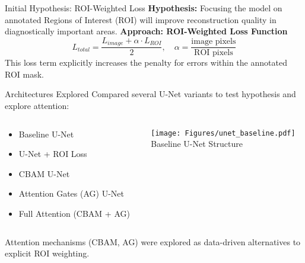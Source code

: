 \documentclass{beamer}
\begin{document}
\begin{frame}{Initial Hypothesis: ROI-Weighted Loss}
  \textbf{Hypothesis:} Focusing the model on annotated Regions of Interest (ROI) will improve reconstruction quality in diagnostically important areas.
  \vfill
  \textbf{Approach: ROI-Weighted Loss Function}
  \[
    L_{total} = \frac{L_{image} + \alpha \cdot L_{ROI}}{2}, \quad
    \alpha = \frac{\text{image pixels}}{\text{ROI pixels}}
  \]
  This loss term explicitly increases the penalty for errors within the annotated ROI mask.
\end{frame}

\begin{frame}{Architectures Explored}
  Compared several U-Net variants to test hypothesis and explore attention:
  \begin{columns}[T] %
    \begin{column}{0.5\textwidth}
      \begin{itemize}
          \item Baseline U-Net
          \item U-Net + ROI Loss
          \item CBAM U-Net
          \item Attention Gates (AG) U-Net
          \item Full Attention (CBAM + AG)
      \end{itemize}
    \end{column}
    \begin{column}{0.5\textwidth}
        \centering
        \texttt{[image: Figures/unet\_baseline.pdf]} \\
        \tiny Baseline U-Net Structure
    \end{column}
  \end{columns}
  \vspace{2mm}
  Attention mechanisms (CBAM, AG) were explored as data-driven alternatives to explicit ROI weighting.
  
\end{frame}
\end{document}

